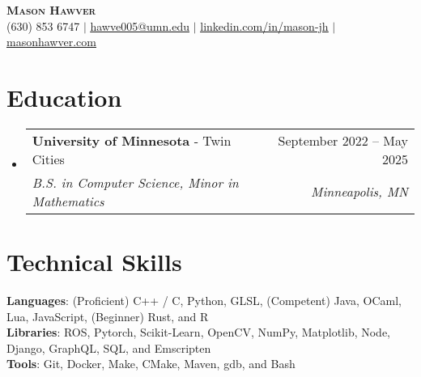 \documentclass[letterpaper,11pt]{article}
\makeatletter
\newcommand{\resumeSubheading}[4]{
  \vspace{-2pt}\item
    \begin{tabular*}{0.97\textwidth}[t]{l@{\extracolsep{\fill}}r}
      #1 & #2 \\
      \textit{\small#3} & \textit{\small #4} \\
    \end{tabular*}\vspace{-7pt}
}
\newcommand{\resumeSubHeadingListStart}{\begin{itemize}[leftmargin=0.15in, label={}]}
\newcommand{\resumeSubHeadingListEnd}{\end{itemize}}
\makeatother
\begin{document}

\begin{center}
    \textbf{\Huge \scshape Mason Hawver} \\ \vspace{1pt}
    \small (630) 853 6747 $|$ \href{mailto:x@x.com}{\underline{hawve005@umn.edu}} $|$ 
    \href{https://linkedin.com/in/...}{\underline{linkedin.com/in/mason-jh}} $|$
    \href{https://github.com/...}{\underline{masonhawver.com}}
\end{center}


\section{Education}
  \resumeSubHeadingListStart
    \resumeSubheading
      {\textbf{University of Minnesota} - Twin Cities}{September 2022 -- May 2025}
      {B.S. in Computer Science, Minor in Mathematics}{Minneapolis, MN}
     \vspace{-1pt}
  \resumeSubHeadingListEnd

\section{Technical Skills}
 \begin{itemize}[leftmargin=0.15in, label={}]
    \small{\item{
     \textbf{Languages}{: (Proficient) C++ / C, Python, GLSL, (Competent) Java, OCaml, Lua, JavaScript, (Beginner) Rust, and R } \\ 
     \vspace{1pt}
     \textbf{Libraries}{: ROS, Pytorch, Scikit-Learn, OpenCV, NumPy, Matplotlib, Node, Django, GraphQL, SQL, and Emscripten} \\
     \vspace{1pt}
     \textbf{Tools}{: Git, Docker, Make, CMake, Maven, gdb, and Bash} \\
    }}
 \end{itemize}
\end{document}
